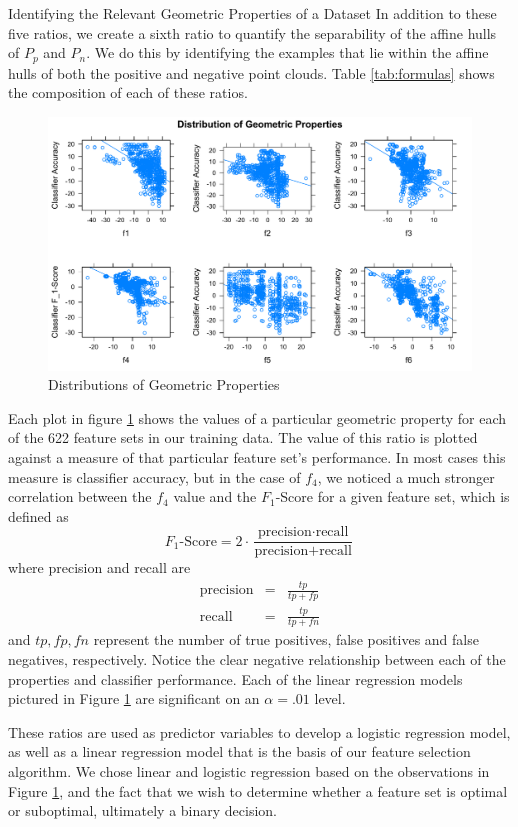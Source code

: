 \documentclass{llncs}
\begin{document}
\begin{section}{Identifying the Relevant Geometric Properties of a Dataset}
In addition to these five ratios, we create a sixth ratio to quantify the separability of the affine hulls of $P_p$ and $P_n$. We do this by identifying the examples that lie within the affine hulls of both the positive and negative point clouds. Table \ref{tab:formulas} shows the composition of each of these ratios.
\begin{figure}[ht]
\includegraphics[scale = .5]{figures/conf_fig}
\caption{Distributions of Geometric Properties}
\label{fig:AllProps}
\end{figure}


Each plot in figure \ref{fig:AllProps} shows the values of a particular geometric property for each of the 622 feature sets in our training data. The value of this ratio is plotted against a measure of that particular feature set's performance. In most cases this measure is classifier accuracy, but in the case of $f_4$, we noticed a much stronger correlation between the $f_4$ value and the $F_1$-Score for a given feature set, which is defined as
$$\text{$F_1$-Score} = 2\cdot\frac{\text{precision}\cdot\text{recall}}{\text{precision}+\text{recall}}$$
where precision and recall are
\begin{eqnarray*}
\text{precision} &=& \frac{tp}{tp + fp}\\
\text{recall} &=& \frac{tp}{tp +fn}\end{eqnarray*}
and $tp,fp,fn$ represent the number of true positives, false positives and false negatives, respectively.
Notice the clear negative relationship between each of the properties and classifier performance. Each of the linear regression models pictured in Figure \ref{fig:AllProps} are significant on an $\alpha = .01$ level. 

These ratios are used as predictor variables to develop a logistic regression model, as well as a linear regression model that is the basis of our feature selection algorithm. We chose linear and logistic regression based on the observations in Figure \ref{fig:AllProps}, and the fact that  we wish to determine whether a feature set is optimal or suboptimal, ultimately a binary decision. 
\end{section}
\end{document}
